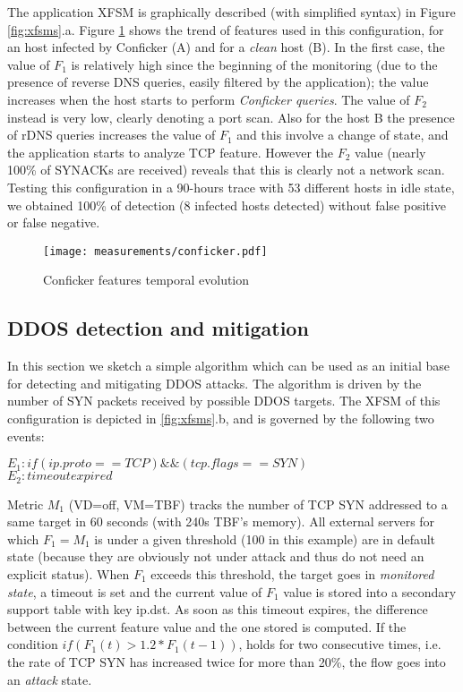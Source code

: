 \documentclass[conference,letterpaper]{sig-alternate-10pt}
\begin{document}
The application XFSM is graphically described (with simplified syntax) in Figure \ref{fig:xfsms}.a. Figure \ref{fig:conficker} shows the trend of features used in this configuration, for an host infected by Conficker (A) and for a \emph{clean} host (B). In the first case, the value of $F_1$ is relatively high since the beginning of the monitoring (due to the presence of reverse DNS queries, easily filtered by the application); the value increases when the host starts to perform \emph{Conficker queries}. The value of $F_2$ instead is very low, clearly denoting a port scan. Also for the host B the presence of rDNS queries increases the value of $F_1$ and this involve a change of state, and the application starts to analyze TCP feature. However the $F_2$ value (nearly 100\% of SYNACKs are received) reveals that this is clearly not a network scan. Testing this configuration in a 90-hours trace with 53 different hosts in idle state, we obtained 100\% of detection (8 infected hosts detected) without false positive or false negative.

\begin{figure}[t]
	\centering
	\texttt{[image: measurements/conficker.pdf]}
	\caption{Conficker features temporal evolution}
	\vspace*{-.5cm}
	\label{fig:conficker}
\end{figure}

\subsection{DDOS detection and mitigation}
\label{ss:use-ddos}
In this section we sketch a simple algorithm which can be used as an initial base for detecting and mitigating DDOS attacks. The algorithm is driven by the number of SYN packets received by possible DDOS targets.  The XFSM of this configuration is depicted in \ref{fig:xfsms}.b, and is governed by the following two events:
\\
\begin{footnotesize}
$E_1: if(ip.proto==TCP)\&\&(tcp.flags==SYN)$ \\
$E_2: timeout expired$ \\
\end{footnotesize}

Metric $M_1$ (VD=off, VM=TBF) tracks the number of TCP SYN addressed to a same target in 60 seconds (with 240s TBF's memory).  All external servers for which $F_1=M_1$ is under a given threshold (100 in this example) are in default state (because they are obviously not under attack and thus do not need an explicit status). When $F_1$ exceeds this threshold,  the target goes in \emph{monitored state}, a timeout is set and the current value of $F_1$ value is stored into a secondary support table with key ip.dst.  As soon as this timeout expires, the difference between the current feature value and the one stored is computed. If the condition $if(F_1(t) > 1.2 * F_1(t-1))$, holds for two consecutive times, i.e. the rate of TCP SYN has increased twice for more than 20\%, the flow goes into an \emph{attack} state.
\end{document}
